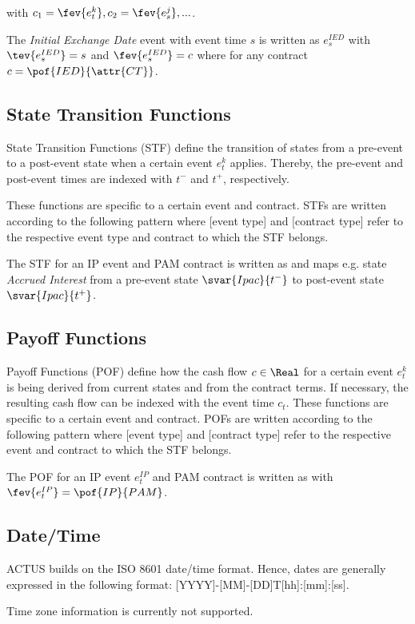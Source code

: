 with $c_1=\fev{e_t^k}, c_2=\fev{e_s^j}, ...$.

\begin{example}
The \textit{Initial Exchange Date} event with event time $s$ is written as $e_s^{IED}$ with $\tev{e_s^{IED}}=s$ and $\fev{e_s^{IED}}=c$ where for any contract  $c=\pof{IED}{\attr{CT}}$.
\end{example}


\subsection{State Transition Functions}\label{sec:stf}

State Transition Functions (STF) define the transition of states from a pre-event to a post-event state when a certain event $e_t^{k}$ applies. Thereby, the pre-event and post-event times are indexed with $t^-$ and $t^+$, respectively. 

These functions are specific to a certain event and contract. STFs are written according to the following pattern  where [event type] and [contract type] refer to the respective event type and contract to which the STF belongs.

\begin{example}
The STF for an IP event and PAM contract is written as  and maps e.g. state \textit{Accrued Interest} from a pre-event state $\svar{Ipac}{t^-}$ to post-event state $\svar{Ipac}{t^+}$.
\end{example}


\subsection{Payoff Functions}\label{sec:pof}

Payoff Functions (POF) define how the cash flow $c\in\Real$ for a certain event $e_t^k$ is being derived from current states and from the contract terms. If necessary, the resulting cash flow can be indexed with the event time $c_t$. These functions are specific to a certain event and contract. POFs are written according to the following pattern  where [event type] and [contract type] refer to the respective event and contract to which the STF belongs.

\begin{example}
The POF for an IP event $e_t^{IP}$ and PAM contract is written as  with $\fev{e_t^{IP}}=\pof{IP}{PAM}$.
\end{example}


\subsection{Date/Time}\label{sec:time}

ACTUS builds on the ISO 8601 date/time format. Hence, dates are generally expressed in the following format: [YYYY]-[MM]-[DD]T[hh]:[mm]:[ss].

Time zone information is currently not supported.

